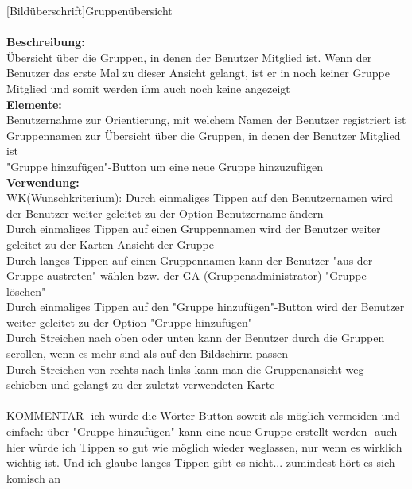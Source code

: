 [Bildüberschrift]Gruppenübersicht\\ \\
\textbf{Beschreibung:}\\
Übersicht über die Gruppen, in denen der Benutzer Mitglied ist. Wenn der Benutzer das erste Mal zu dieser Ansicht gelangt, ist er in noch keiner Gruppe Mitglied und somit werden ihm auch noch keine angezeigt\\
\textbf{Elemente:}\\
Benutzernahme zur Orientierung, mit welchem Namen der Benutzer registriert ist\\
Gruppennamen zur Übersicht über die Gruppen, in denen der Benutzer Mitglied ist\\
"Gruppe hinzufügen"-Button um eine neue Gruppe hinzuzufügen\\
\textbf{Verwendung:}\\
WK(Wunschkriterium): Durch einmaliges Tippen auf den Benutzernamen wird der Benutzer weiter geleitet zu der Option Benutzername ändern\\
Durch einmaliges Tippen auf einen Gruppennamen wird der Benutzer weiter geleitet zu der Karten-Ansicht der Gruppe\\
Durch langes Tippen auf einen Gruppennamen kann der Benutzer "aus der Gruppe austreten" wählen bzw. der GA (Gruppenadministrator) "Gruppe löschen"\\
Durch einmaliges Tippen auf den "Gruppe hinzufügen"-Button wird der Benutzer weiter geleitet zu der Option "Gruppe hinzufügen"\\
Durch Streichen nach oben oder unten kann der Benutzer durch die Gruppen scrollen, wenn es mehr sind als auf den Bildschirm passen\\
Durch Streichen von rechts nach links kann man die Gruppenansicht weg schieben und gelangt zu der zuletzt verwendeten Karte\\ \\

KOMMENTAR
-ich würde die Wörter Button soweit als möglich vermeiden und einfach: über "Gruppe hinzufügen" kann eine neue Gruppe erstellt werden
-auch hier würde ich Tippen so gut wie möglich wieder weglassen, nur wenn es wirklich wichtig ist. Und ich glaube langes Tippen gibt es nicht... zumindest hört es sich komisch an


